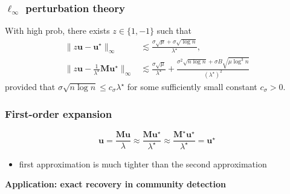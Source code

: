 \documentclass[compress,
mathserif,wide,%
]{beamer}
\begin{document}
\begin{frame}
	\frametitle{$\ell_{\infty}$ perturbation theory}
\begin{theorem}
	With high prob, there exists $z \in \{1, -1\}$ such that 
%
\begin{subequations}
\label{eq:UsgnH-Ustar-MUstar-bound-theorem-general}
\begin{align}
\big\|z\bm{u}-\bm{u}^{\star}\big\|_{\infty}  &\lesssim \frac{\sigma\sqrt{\mu}+\sigma\sqrt{\log n}}{ \lambda^{\star} },
\label{eq:UsgnH-Ustar-bound-theorem-general}\\
\big\|z\bm{u}-\frac{1}{\lambda^{\star}}\bm{M}\bm{u}^{\star}\big\|_{\infty} &\lesssim \frac{\sigma\sqrt{\mu}}{ \lambda^{\star} }+ \frac{\sigma^{2}\sqrt{n\log n}+\sigma B\sqrt{\mu \log^{3}n}}{(\lambda^{\star})^{2} }
\label{eq:UsgnH-MUstar-bound-theorem-general}
\end{align}
\end{subequations}
%
provided that $\sigma \sqrt{n \log n}  \leq c_{\sigma}\lambda^{\star} $ for some sufficiently small constant $c_{\sigma}>0$. 
\end{theorem}



\end{frame}

\begin{frame}
	\frametitle{First-order expansion}
	\vfill
	\[
	\bm{u} = \frac{\bm{M} \bm{u}}{\lambda} \approx \frac{\bm{M} \bm{u}^\star}{ \lambda^\star} \approx \frac{\bm{M}^\star \bm{u}^\star}{ \lambda^\star} = \bm{u^\star}
	\]
	\vfill
	\begin{itemize}
		\item first approximation is much tighter than the second approximation
	\end{itemize}
\end{frame}

\begin{frame}[plain]
\vfill
\centering
{\large \bf Application: exact recovery in community detection}
\vfill
\end{frame}
\end{document}
